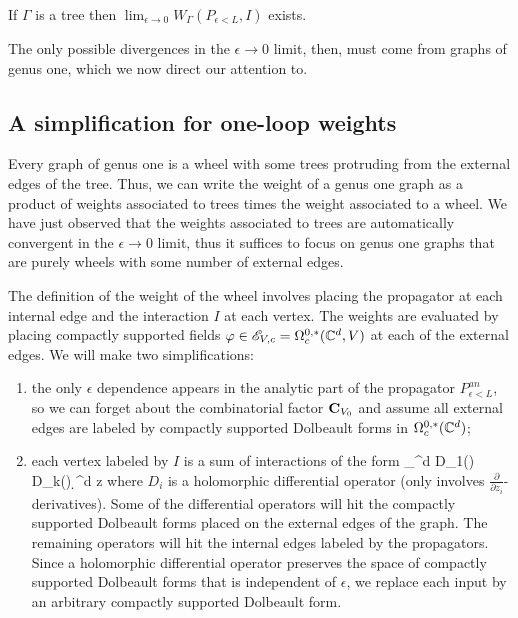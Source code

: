 \documentclass[10pt]{amsart}
\begin{document}
\begin{lem} 
If $\Gamma$ is a tree then $\lim_{\epsilon \to 0} W_{\Gamma}(P_{\epsilon < L}, I)$ exists.
\end{lem}

The only possible divergences in the $\epsilon \to 0$ limit, then, must come from graphs of genus one, which we now direct our attention to.

\subsection{A simplification for one-loop weights}

Every graph of genus one is a wheel with some trees protruding from the external edges of the tree.
Thus, we can write the weight of a genus one graph as a product of weights associated to trees times the weight associated to a wheel.
We have just observed that the weights associated to trees are automatically convergent in the $\epsilon \to 0$ limit, thus it suffices to focus on genus one graphs that are purely wheels with some number of external edges.

The definition of the weight of the wheel involves placing the propagator at each internal edge and the interaction $I$ at each vertex. 
The weights are evaluated by placing compactly supported fields $\varphi \in \mathscr E_{V,c} = \Omega^{0,*}_c(\mathbb C^d, V)$ at each of the external edges.
We will make two simplifications:
\begin{enumerate}
\item the only $\epsilon$ dependence appears in the analytic part of the propagator $P_{\epsilon<L}^{an}$, so we can forget about the combinatorial factor ${\bf C}_{V_0}$ and assume all external edges are labeled by compactly supported Dolbeault forms in $\Omega^{0,*}_c(\mathbb C^d)$;
\item each vertex labeled by $I$ is a sum of interactions of the form
\ben
\int_{\CC^d} D_1(\varphi) \cdots D_k(\varphi) \d^d z
\een
where $D_i$ is a holomorphic differential operator (only involves $\frac{\partial}{\partial z_i}$-derivatives). 
Some of the differential operators will hit the compactly supported Dolbeault forms placed on the external edges of the graph.
The remaining operators will hit the internal edges labeled by the propagators.
Since a holomorphic differential operator preserves the space of compactly supported Dolbeault forms that is independent of $\epsilon$, we replace each input by an arbitrary compactly supported Dolbeault form.
\end{enumerate}
\end{document}
